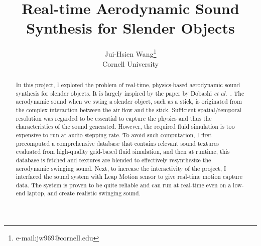 \documentclass[tog]{acmsiggraph}
\title{Real-time Aerodynamic Sound Synthesis for Slender Objects }
\author{Jui-Hsien Wang\thanks{e-mail:jw969@cornell.edu}\\Cornell University}
\def\etal{\emph{et al.}}
\begin{document}


\maketitle

\begin{abstract}

In this project, I explored the problem of real-time, physics-based aerodynamic sound synthesis for slender objects. It is largely inspired by the paper by Dobashi \etal~\cite{dobashi2003}. The aerodynamic sound when we swing a slender object, such as a stick, is originated from the complex interaction between the air flow and the stick. Sufficient spatial/temporal resolution was regarded to be essential to capture the physics and thus the characteristics of the sound generated. However, the required fluid simulation is too expensive to run at audio stepping rate. To avoid such computation, I first precomputed a comprehensive database that contains relevant sound textures evaluated from high-quality grid-based fluid simulation, and then at runtime, this database is fetched and textures are blended to effectively resynthesize the aerodynamic swinging sound. Next, to increase the interactivity of the project, I interfaced the sound system with Leap Motion sensor to give real-time motion capture data. The system is proven to be quite reliable and can run at real-time even on a low-end laptop, and create realistic swinging sound. 

\end{abstract}

\end{document}

